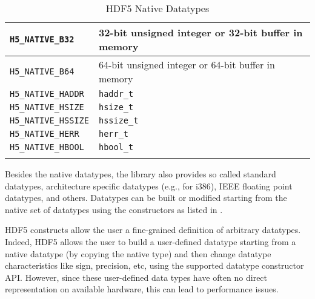 \begin{longtable}{|>{\centering\arraybackslash} m{5.5cm} | >{\centering\arraybackslash} m{6cm} |}
        \small \texttt{H5\_NATIVE\_B32}     & \small 32-bit unsigned integer or 32-bit buffer in memory \\ \hline
        \small \texttt{H5\_NATIVE\_B64}     & \small 64-bit unsigned integer or 64-bit buffer in memory \\ \hline
        \small \texttt{H5\_NATIVE\_HADDR}   & \small \texttt{haddr\_t}                                  \\ \hline
        \small \texttt{H5\_NATIVE\_HSIZE}   & \small \texttt{hsize\_t}                                  \\ \hline
        \small \texttt{H5\_NATIVE\_HSSIZE}  & \small \texttt{hssize\_t}                                 \\ \hline
        \small \texttt{H5\_NATIVE\_HERR}    & \small \texttt{herr\_t}                                   \\ \hline
        \small \texttt{H5\_NATIVE\_HBOOL}   & \small \texttt{hbool\_t}                                  \\ \hline
        \caption{HDF5 Native Datatypes}
        \label{table: hdf5-types}
\end{longtable}

Besides the native datatypes, the library also provides so called standard datatypes, architecture specific datatypes (e.g., for i386), IEEE floating point datatypes, and others.
Datatypes can be built or modified starting from the native set of datatypes using the constructors as listed in .

HDF5 constructs allow the user a fine-grained definition of arbitrary datatypes.
Indeed, HDF5 allows the user to build a user-defined datatype starting from a native datatype (by copying the native type) and then change datatype characteristics like sign, precision, etc, using the supported datatype constructor API.
However, since these user-defined data types have often no direct representation on available hardware, this can lead to performance issues.

\clearpage


